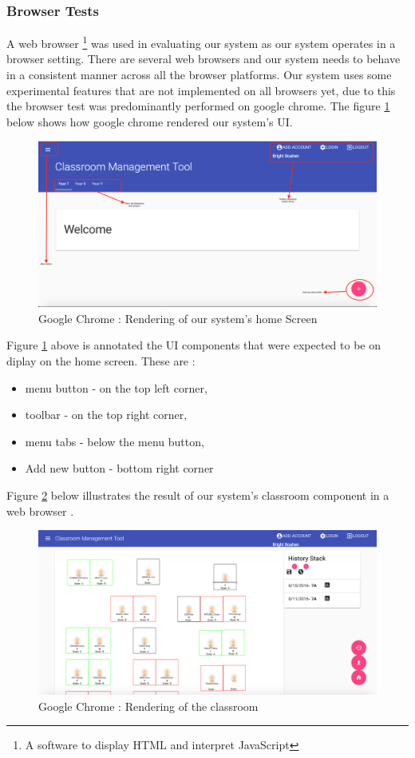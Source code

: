 \subsubsection{Browser Tests}
A web browser \footnote{A software to display HTML and interpret JavaScript} was used in evaluating our system as our system operates in a browser setting. There are several web browsers and our system needs to behave in a consistent manner across all the browser platforms. Our system uses some experimental features that are not implemented on all browsers yet, due to this the browser test was predominantly performed on google chrome. \cite{website:GoogleChrome}
The figure \ref{fig:homeScreen} below shows how google chrome rendered our system's UI.
\begin{figure}[!ht]
\caption{Google Chrome : Rendering of our system's home Screen}
    \label{fig:homeScreen}
    \centering
    \includegraphics[scale=0.3]{figures/home_screen}
\end{figure}
Figure \ref{fig:homeScreen} above is annotated the UI components that were expected to be on diplay on the home screen. These are :
\begin{itemize}
    \item menu button -  on the top left corner,
    \item toolbar - on the top right corner,
    \item menu tabs - below the menu button, 
    \item Add new button - bottom right corner
\end{itemize}
Figure \ref{fig:canvas} below illustrates the result of our system's classroom component in a web browser \cite{website:GoogleChrome}.
\begin{figure}[!ht]
    \caption{Google Chrome : Rendering of the classroom}
    \label{fig:canvas}
    \centering
    \includegraphics[scale=0.3]{figures/classroom}
\end{figure}
